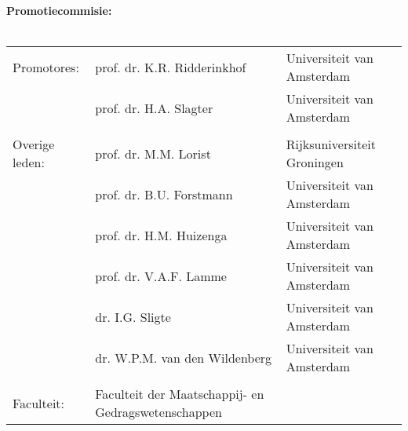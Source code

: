 {%
\clearpage
\noindent%
{\bf Promotiecommisie:}\\
\\
\begin{tabular}[t]{@{}p{2.25cm}ll}
Promotores:    & prof. dr. K.R. Ridderinkhof    & Universiteit van Amsterdam \\  %
               & prof. dr. H.A. Slagter         & Universiteit van Amsterdam \\  %
\\
Overige leden: & prof. dr. M.M. Lorist          & Rijksuniversiteit Groningen \\ %
               & prof. dr. B.U. Forstmann       & Universiteit van Amsterdam \\  %
               & prof. dr. H.M. Huizenga        & Universiteit van Amsterdam \\  %
               & prof. dr. V.A.F. Lamme         & Universiteit van Amsterdam \\  %
               & dr. I.G. Sligte                & Universiteit van Amsterdam \\  %
               & dr. W.P.M. van den Wildenberg  & Universiteit van Amsterdam \\  %
\\
Faculteit:     & Faculteit der Maatschappij- en Gedragswetenschappen \\ %
\end{tabular}\\

\clearpage
} %